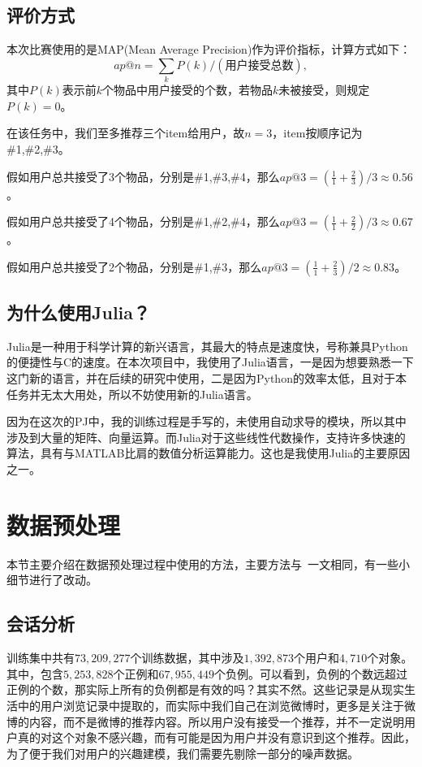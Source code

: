 \documentclass[12pt]{article} %
\begin{document}
\begin{sloppypar}
\subsection{评价方式}

本次比赛使用的是MAP(Mean Average Precision)作为评价指标，计算方式如下：
\begin{equation}
ap@n = \sum_{k} P(k) / (\textit{用户接受总数}),
\end{equation}
其中$P(k)$表示前$k$个物品中用户接受的个数，若物品$k$未被接受，则规定$P(k)=0$。

在该任务中，我们至多推荐三个item给用户，故$n=3$，item按顺序记为\#1,\#2,\#3。

假如用户总共接受了3个物品，分别是\#1,\#3,\#4，那么$ap@3 = (\frac{1}{1} + \frac{2}{3}) / 3 \approx 0.56$。

假如用户总共接受了4个物品，分别是\#1,\#2,\#4，那么$ap@3 = (\frac{1}{1} + \frac{2}{2}) / 3 \approx 0.67$。 

假如用户总共接受了2个物品，分别是\#1,\#3，那么$ap@3 = (\frac{1}{1} + \frac{2}{3}) / 2 \approx 0.83$。 

\subsection{为什么使用Julia？}

Julia是一种用于科学计算的新兴语言，其最大的特点是速度快，号称兼具Python的便捷性与C的速度。在本次项目中，我使用了Julia语言，一是因为想要熟悉一下这门新的语言，并在后续的研究中使用，二是因为Python的效率太低，且对于本任务并无太大用处，所以不妨使用新的Julia语言。

因为在这次的PJ中，我的训练过程是手写的，未使用自动求导的模块，所以其中涉及到大量的矩阵、向量运算。而Julia对于这些线性代数操作，支持许多快速的算法，具有与MATLAB比肩的数值分析运算能力。这也是我使用Julia的主要原因之一。


\newpage
\section{数据预处理}

本节主要介绍在数据预处理过程中使用的方法，主要方法与~\cite{chen2012context}一文相同，有一些小细节进行了改动。

\subsection{会话分析}

训练集中共有$73,209,277$个训练数据，其中涉及$1,392,873$个用户和$4,710$个对象。其中，包含$5,253,828$个正例和$67,955,449$个负例。可以看到，负例的个数远超过正例的个数，那实际上所有的负例都是有效的吗？其实不然。这些记录是从现实生活中的用户浏览记录中提取的，而实际中我们自己在浏览微博时，更多是关注于微博的内容，而不是微博的推荐内容。所以用户没有接受一个推荐，并不一定说明用户真的对这个对象不感兴趣，而有可能是因为用户并没有意识到这个推荐。因此，为了便于我们对用户的兴趣建模，我们需要先剔除一部分的噪声数据。


\end{sloppypar}
\end{document}
